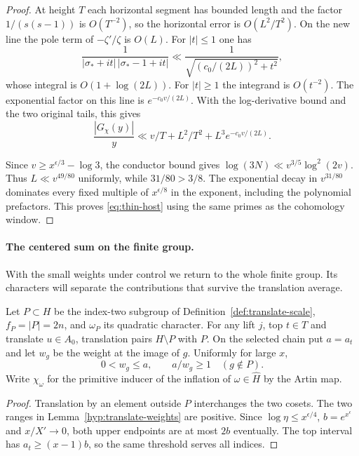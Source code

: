 \begin{proof}
At height \(T\) each horizontal
segment has bounded length and the factor \(1/(s(s-1))\)
is \(O(T^{-2})\), so the horizontal error is \(O(L^2/T^2)\).
On the new line the pole term of \(-\zeta'/\zeta\) is \(O(L)\).
For \(|t|\le1\) one has
\[
 \frac{1}{|\sigma_*+it|\,|\sigma_*-1+it|}
        \ll \frac{1}{\sqrt{(c_0/(2L))^2+t^2}},
\]
whose integral is \(O(1+\log(2L))\).
For \(|t|\ge1\) the integrand is \(O(t^{-2})\).
The exponential factor on this line is \(e^{-c_0 v/(2L)}\).
With the log-derivative bound and the two original tails,
this gives
\[
 \frac{|G_\chi(y)|}{y}
  \ll v/T + L^2/T^2 + L^3 e^{-c_0 v/(2L)} .
\]

Since \(v\ge x^{\epsilon/3}-\log 3\), the conductor bound gives
\(\log(3N)\ll v^{3/5}\log^2(2v)\). Thus
\(L\ll v^{49/80}\) uniformly, while \(31/80>3/8\).
The exponential decay in \(v^{31/80}\) dominates every fixed
multiple of \(x^{\epsilon/8}\) in the exponent, including the
polynomial prefactors. This proves \eqref{eq:thin-host} using the
same primes as the cohomology window.
\end{proof}

\paragraph{The centered sum on the finite group.}
With the small weights under control we return to the whole finite group. Its
characters will separate the contributions that survive the translation average.

\begin{established}\label{hyp:inertia-fourier}
Let \(P\subset H\) be the index-two subgroup of Definition~\ref{def:translate-scale},
\(f_P=|P|=2n\), and \(\omega_P\) its quadratic character. For any lift
\(j\), top \(t\in T\) and translate \(u\in A_0\), translation pairs
\(H\setminus P\) with \(P\). On the selected chain put \(a=a_t\)
and let \(w_g\) be the weight at the image of \(g\). Uniformly for large \(x\),
\[
                0<w_g\le a,\qquad a/w_g\ge1\quad(g\notin P).
\]
Write \(\chi_\omega\) for the primitive inducer of the inflation of
\(\omega\in\widehat H\) by the Artin map.
\end{established}
\begin{proof}
Translation by an element outside \(P\) interchanges the two cosets.
The two ranges in Lemma~\ref{hyp:translate-weights} are positive.
Since \(\log\eta\le x^{\epsilon/4}\), \(b=e^{x^\epsilon}\) and
\(x/X'\to0\), both upper endpoints are at most \(2b\) eventually.
The top interval has \(a_t\ge(x-1)b\), so the same threshold serves all indices.
\end{proof}

